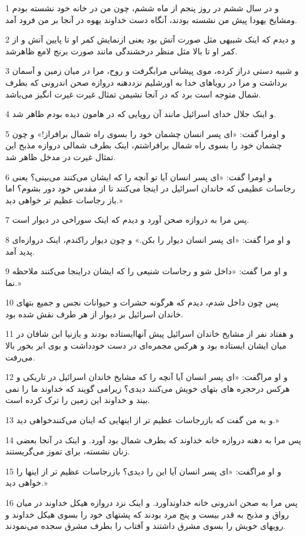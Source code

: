 \par 1 و در سال ششم در روز پنجم از ماه ششم، چون من در خانه خود نشسته بودم ومشایخ یهودا پیش من نشسته بودند، آنگاه دست خداوند یهوه در آنجا بر من فرود آمد.
\par 2 و دیدم که اینک شبیهی مثل صورت آتش بود یعنی ازنمایش کمر او تا پایین آتش و از کمر او تا بالا مثل منظر درخشندگی مانند صورت برنج لامع ظاهرشد.
\par 3 و شبیه دستی دراز کرده، موی پیشانی مرابگرفت و روح، مرا در میان زمین و آسمان برداشت و مرا در رویاهای خدا به اورشلیم نزددهنه دروازه صحن اندرونی که بطرف شمال متوجه است برد که در آنجا نشیمن تمثال غیرت غیرت انگیز می‌باشد.
\par 4 و اینک جلال خدای اسرائیل مانند آن رویایی که در هامون دیده بودم ظاهر شد.
\par 5 و اومرا گفت: «ای پسر انسان چشمان خود را بسوی راه شمال برافراز!» و چون چشمان خود را بسوی راه شمال برافراشتم، اینک بطرف شمالی دروازه مذبح این تمثال غیرت در مدخل ظاهر شد.
\par 6 و اومرا گفت: «ای پسر انسان آیا تو آنچه را که ایشان می‌کنند می‌بینی؟ یعنی رجاسات عظیمی که خاندان اسرائیل در اینجا می‌کنند تا از مقدس خود دور بشوم؟ اما باز رجاسات عظیم تر خواهی دید.»
\par 7 پس مرا به دروازه صحن آورد و دیدم که اینک سوراخی در دیوار است.
\par 8 و او مرا گفت: «ای پسر انسان دیوار را بکن.» و چون دیوار راکندم، اینک دروازه‌ای پدید آمد.
\par 9 و او مرا گفت: «داخل شو و رجاسات شنیعی را که ایشان دراینجا می‌کنند ملاحظه نما.»
\par 10 پس چون داخل شدم، دیدم که هرگونه حشرات و حیوانات نجس و جمیع بتهای خاندان اسرائیل بر دیوار از هر طرف نقش شده بود.
\par 11 و هفتاد نفر از مشایخ خاندان اسرائیل پیش آنهاایستاده بودند و یازنیا ابن شافان در میان ایشان ایستاده بود و هرکس مجمره‌ای در دست خودداشت و بوی ابر بخور بالا می‌رفت.
\par 12 و او مراگفت: «ای پسر انسان آیا آنچه را که مشایخ خاندان اسرائیل در تاریکی و هرکس درحجره های بتهای خویش می‌کنند دیدی؟ زیرامی گویند که خداوند ما را نمی بیند و خداوند این زمین را ترک کرده است.
\par 13 و به من گفت که بازرجاسات عظیم تر از اینهایی که اینان می‌کنندخواهی دید.»
\par 14 پس مرا به دهنه دروازه خانه خداوند که بطرف شمال بود آورد. و اینک در آنجا بعضی زنان نشسته، برای تموز می‌گریستند.
\par 15 و او مراگفت: «ای پسر انسان آیا این را دیدی؟ بازرجاسات عظیم تر از اینها را خواهی دید.»
\par 16 پس مرا به صحن اندرونی خانه خداوندآورد. و اینک نزد دروازه هیکل خداوند در میان رواق و مذبح به قدر بیست و پنج مرد بودند که پشتهای خود را بسوی هیکل خداوند و رویهای خویش را بسوی مشرق داشتند و آفتاب را بطرف مشرق سجده می‌نمودند.
